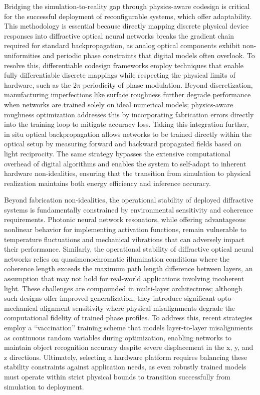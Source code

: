 \documentclass[11pt]{article}
\begin{document}
Bridging the simulation-to-reality gap through physics-aware codesign is critical for the successful deployment of reconfigurable systems, which offer adaptability. This methodology is essential because directly mapping discrete physical device responses into diffractive optical neural networks breaks the gradient chain required for standard backpropagation, as analog optical components exhibit non-uniformities and periodic phase constraints that digital models often overlook. To resolve this, differentiable codesign frameworks employ techniques that enable fully differentiable discrete mappings while respecting the physical limits of hardware, such as the \(2\pi\) periodicity of phase modulation. Beyond discretization, manufacturing imperfections like surface roughness further degrade performance when networks are trained solely on ideal numerical models; physics-aware roughness optimization addresses this by incorporating fabrication errors directly into the training loop to mitigate accuracy loss. Taking this integration further, in situ optical backpropagation allows networks to be trained directly within the optical setup by measuring forward and backward propagated fields based on light reciprocity. The same strategy bypasses the extensive computational overhead of digital algorithms and enables the system to self-adapt to inherent hardware non-idealities, ensuring that the transition from simulation to physical realization maintains both energy efficiency and inference accuracy. \citep{doi_10_1145_3508352_3549378_13c53996} \citep{doi_10_1109_dac56929_2023_10247715_f78d6713} \citep{doi_10_1364_prj_389553_d7a30418}

Beyond fabrication non-idealities, the operational stability of deployed diffractive systems is fundamentally constrained by environmental sensitivity and coherence requirements. Photonic neural network resonators, while offering advantageous nonlinear behavior for implementing activation functions, remain vulnerable to temperature fluctuations and mechanical vibrations that can adversely impact their performance. Similarly, the operational stability of diffractive optical neural networks relies on quasimonochromatic illumination conditions where the coherence length exceeds the maximum path length difference between layers, an assumption that may not hold for real-world applications involving incoherent light. These challenges are compounded in multi-layer architectures; although such designs offer improved generalization, they introduce significant opto-mechanical alignment sensitivity where physical misalignments degrade the computational fidelity of trained phase profiles. To address this, recent strategies employ a ``vaccination'' training scheme that models layer-to-layer misalignments as continuous random variables during optimization, enabling networks to maintain object recognition accuracy despite severe displacement in the x, y, and z directions. Ultimately, selecting a hardware platform requires balancing these stability constraints against application needs, as even robustly trained models must operate within strict physical bounds to transition successfully from simulation to deployment. \citep{doi_10_3390_nano14080697_c372a140} \citep{doi_10_1364_oe_523619_ddeb1b53} \citep{doi_10_1515_nanoph_2020_0291_c4a9f42d}
\end{document}
